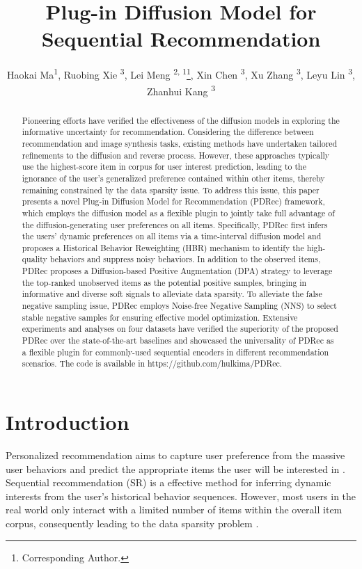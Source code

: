 \documentclass[letterpaper]{article} %
\title{Plug-in Diffusion Model for Sequential Recommendation}
\author{
    Haokai Ma\textsuperscript{\rm 1},
    Ruobing Xie \textsuperscript{\rm 3},
    Lei Meng \textsuperscript{\rm 2, \rm 1}\thanks{Corresponding Author.},
    Xin Chen \textsuperscript{\rm 3},
    Xu Zhang \textsuperscript{\rm 3},
    Leyu Lin \textsuperscript{\rm 3},
    Zhanhui Kang \textsuperscript{\rm 3}
}
\begin{document}
\maketitle

\begin{abstract}
Pioneering efforts have verified the effectiveness of the diffusion models in exploring the informative uncertainty for recommendation. Considering the difference between recommendation and image synthesis tasks, existing methods have undertaken tailored refinements to the diffusion and reverse process. However, these approaches typically use the highest-score item in corpus for user interest prediction, leading to the ignorance of the user's generalized preference contained within other items, thereby remaining constrained by the data sparsity issue. To address this issue, this paper presents a novel Plug-in Diffusion Model for Recommendation (PDRec) framework, which employs the diffusion model as a flexible plugin to jointly take full advantage of the diffusion-generating user preferences on all items. Specifically, PDRec first infers the users' dynamic preferences on all items via a time-interval diffusion model and proposes a Historical Behavior Reweighting (HBR) mechanism to identify the high-quality behaviors and suppress noisy behaviors. In addition to the observed items, PDRec proposes a Diffusion-based Positive Augmentation (DPA) strategy to leverage the top-ranked unobserved items as the potential positive samples, bringing in informative and diverse soft signals to alleviate data sparsity. To alleviate the false negative sampling issue, PDRec employs Noise-free Negative Sampling (NNS) to select stable negative samples for ensuring effective model optimization. Extensive experiments and analyses on four datasets have verified the superiority of the proposed PDRec over the state-of-the-art baselines and showcased the universality of PDRec as a flexible plugin for commonly-used sequential encoders in different recommendation scenarios. The code is available in https://github.com/hulkima/PDRec.
\end{abstract}

\section{Introduction}
Personalized recommendation aims to capture user preference from the massive user behaviors and predict the appropriate items the user will be interested in \cite{RS3,RS2,RS1}. Sequential recommendation (SR) is a effective method for inferring dynamic interests from the user's historical behavior sequences\cite{DGSR, MLP4Rec, ICLRec}. However, most users in the real world only interact with a limited number of items within the overall item corpus, consequently leading to the data sparsity problem \cite{xia2021knowledge, P2FCDR, chen2023enhanced}.
\end{document}
